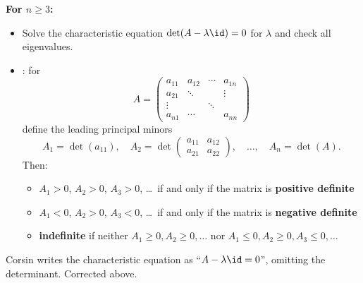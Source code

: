 \textbf{For $n \geq 3$:}
\begin{itemize}
  \item Solve the characteristic equation $\det(A - \lambda\id) = 0$ for $\lambda$ and check all
    eigenvalues.
  \item {} : for
    \[A = \begin{pmatrix} a_{11} & a_{12} & \cdots & a_{1n} \\ a_{21} & \ddots & & \vdots \\ \vdots & & \ddots & \\ a_{n1} & \cdots & & a_{nn}\end{pmatrix}\]
    define the leading principal minors
    \[A_1 = \det(a_{11}), \quad A_2 = \det\begin{pmatrix} a_{11} & a_{12} \\ a_{21} & a_{22}\end{pmatrix}, \quad \dots, \quad A_n = \det(A).\]
    Then:
    \begin{itemize}
      \item $A_1 > 0$, $A_2 > 0$, $A_3 > 0$, \ldots\ if and only if the matrix is \textbf{positive definite}
      \item $A_1 < 0$, $A_2 > 0$, $A_3 < 0$, \ldots\ if and only if the matrix is \textbf{negative definite}
      \item \textbf{indefinite} if neither $A_1 \geq 0, A_2 \geq 0, \dots$ nor
        $A_1 \leq 0, A_2 \geq 0, A_3 \leq 0, \dots$
    \end{itemize}
\end{itemize}

\begin{ainote}
Corsin writes the characteristic equation as ``$A - \lambda\id = 0$'', omitting the determinant.
Corrected above.
\end{ainote}

